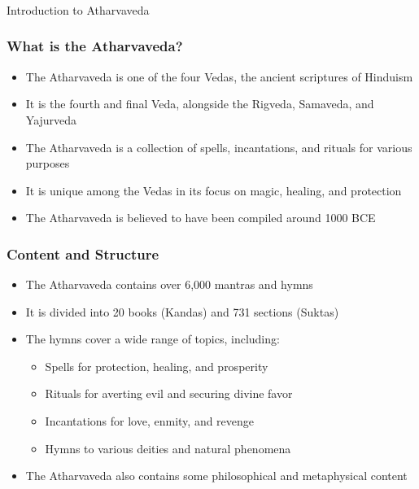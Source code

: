 \begin{frame}[fragile]\frametitle{}
\begin{center}
{\Large Introduction to Atharvaveda}
\end{center}
\end{frame}

\begin{frame}[fragile]\frametitle{What is the Atharvaveda?}
    \begin{itemize}
        \item The Atharvaveda is one of the four Vedas, the ancient scriptures of Hinduism
        \item It is the fourth and final Veda, alongside the Rigveda, Samaveda, and Yajurveda
        \item The Atharvaveda is a collection of spells, incantations, and rituals for various purposes
        \item It is unique among the Vedas in its focus on magic, healing, and protection
        \item The Atharvaveda is believed to have been compiled around 1000 BCE
    \end{itemize}
\end{frame}

\begin{frame}[fragile]\frametitle{Content and Structure}
    \begin{itemize}
        \item The Atharvaveda contains over 6,000 mantras and hymns
        \item It is divided into 20 books (Kandas) and 731 sections (Suktas)
        \item The hymns cover a wide range of topics, including:
            \begin{itemize}
                \item Spells for protection, healing, and prosperity
                \item Rituals for averting evil and securing divine favor
                \item Incantations for love, enmity, and revenge
                \item Hymns to various deities and natural phenomena
            \end{itemize}
        \item The Atharvaveda also contains some philosophical and metaphysical content
    \end{itemize}
\end{frame}

